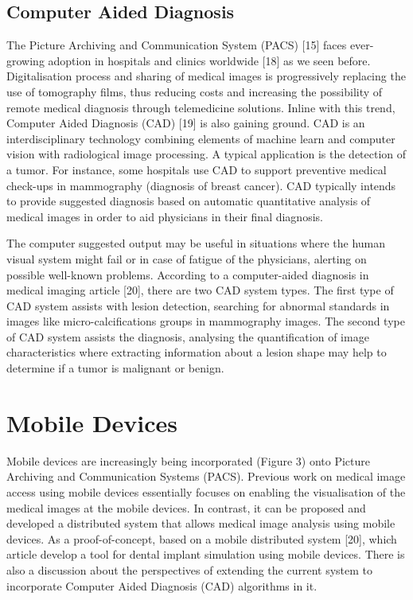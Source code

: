 \subsection{Computer Aided Diagnosis}

The Picture Archiving and Communication System (PACS) [15] faces ever-growing adoption in hospitals and clinics worldwide [18] as we seen before. Digitalisation process and sharing of medical images is progressively replacing the use of tomography films, thus reducing costs and increasing the possibility of remote medical diagnosis through telemedicine solutions. Inline with this trend, Computer Aided Diagnosis (CAD) [19] is also gaining ground. CAD is an interdisciplinary technology combining elements of machine learn and computer vision with radiological image processing. A typical application is the detection of a tumor. For instance, some hospitals use CAD to support preventive medical check-ups in mammography (diagnosis of breast cancer). CAD typically intends to provide suggested diagnosis based on automatic quantitative analysis of medical images in order to aid physicians in their final diagnosis.

The computer suggested output may be useful in situations where the human visual system might fail or in case of fatigue of the physicians, alerting on possible well-known problems. According to a computer-aided diagnosis in medical imaging article [20], there are two CAD system types. The first type of CAD system assists with lesion detection, searching for abnormal standards in images like micro-calcifications groups in mammography images. The second type of CAD system assists the diagnosis, analysing the quantification of image characteristics where extracting information about a lesion shape may help to determine if a tumor is malignant or benign.

\clearpage

\section{Mobile Devices}

Mobile devices are increasingly being incorporated (Figure 3) onto Picture Archiving and Communication Systems (PACS). Previous work on medical image access using mobile devices essentially focuses on enabling the visualisation of the medical images at the mobile devices. In contrast, it can be proposed and developed a distributed system that allows medical image analysis using mobile devices. As a proof-of-concept, based on a mobile distributed system [20], which article develop a tool for dental implant simulation using mobile devices. There is also a discussion about the perspectives of extending the current system to incorporate Computer Aided Diagnosis (CAD) algorithms in it.


